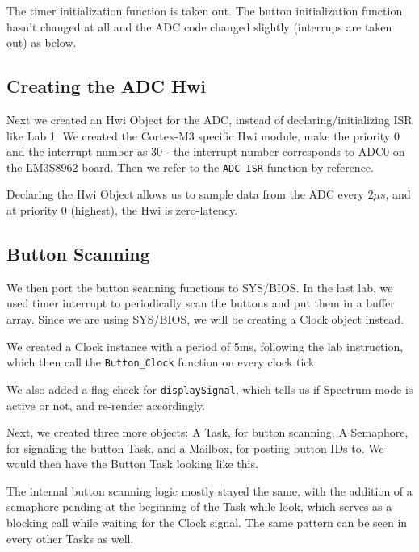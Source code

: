 \documentclass[12pt,oneside,letterpaper]{article}
\begin{document}


The timer initialization function is taken out. The button initialization function hasn’t changed at all and the ADC code changed slightly (interrups are taken out) as below.

\subsection{Creating the ADC Hwi}
Next we created an Hwi Object for the ADC, instead of declaring/initializing ISR like Lab 1. We created the Cortex-M3 specific Hwi module, make the priority 0 and the interrupt number as 30 - the interrupt number corresponds to ADC0 on the LM3S8962 board. Then we refer to the \texttt{ADC\_ISR} function by reference.

Declaring the Hwi Object allows us to sample data from the ADC every $2\mu s$, and at priority 0 (highest), the Hwi is zero-latency.

\subsection{Button Scanning}
We then port the button scanning functions to SYS/BIOS. In the last lab, we used timer interrupt to periodically scan the buttons and put them in a buffer array. Since we are using SYS/BIOS, we will be creating a Clock object instead. 

We created a Clock instance with a period of 5ms, following the lab instruction, which then call the \texttt{Button\_Clock} function on every clock tick. 



We also added a flag check for \texttt{displaySignal}, which tells us if Spectrum mode is active or not, and re-render accordingly.

Next, we created three more objects: A Task, for button scanning, A Semaphore, for signaling the button Task, and a Mailbox, for posting button IDs to. We would then have the Button Task looking like this. 



The internal button scanning logic mostly stayed the same, with the addition of a semaphore pending at the beginning of the Task while look, which serves as a blocking call while waiting for the Clock signal. The same pattern can be seen in every other Tasks as well.
\end{document}
